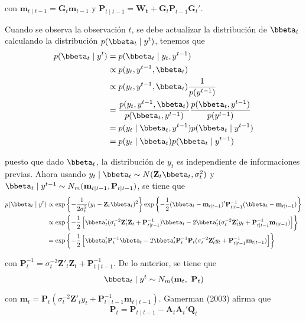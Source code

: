 con $\mathbf{m}_{t\mid t-1}=\mathbf{G}_t\mathbf{m}_{t-1}$ y $\mathbf{P}_{t\mid t-1}=\mathbf{W_t}+\mathbf{G}_t\mathbf{P}_{t-1}\mathbf{G}_t'$.

Cuando se observa la observación $t$, se debe actualizar la distribución de $\bbeta_t$ calculando la distribución $p(\bbeta_t \mid y^t)$, tenemos que
\begin{align*}
p(\bbeta_t \mid y^t)&=p(\bbeta_t \mid y_t,y^{t-1})\\
&\propto p(y_t,y^{t-1},\bbeta_t)\\
&\propto p(y_t,y^{t-1},\bbeta_t)\frac{1}{p(y^{t-1})}\\
&=\frac{p(y_t,y^{t-1},\bbeta_t)}{p(\bbeta_t,y^{t-1})}\frac{p(\bbeta_t,y^{t-1})}{p(y^{t-1})}\\
&=p(y_t \mid \bbeta_t,y^{t-1})p(\bbeta_t \mid y^{t-1})\\
&=p(y_t \mid \bbeta_t)p(\bbeta_t \mid y^{t-1})
\end{align*}

puesto que dado $\bbeta_t$, la distribución de $y_t$ es independiente de informaciones previas. Ahora usando $y_t \mid \bbeta_t\sim N(\mathbf{Z}_t\bbeta_t,\sigma^2_t)$ y $\bbeta_t \mid y^{t-1}\sim N_m(\mathbf{m}_{t\mid t-1},\mathbf{P}_{t\mid t-1})$, se tiene que
\begin{align*}
p(\bbeta_t \mid y^t)&\propto \exp\left\{-\frac{1}{2\sigma_t^2}(y_t-\mathbf{Z}_t\bbeta_t)^2\right\}\exp\left\{-\frac{1}{2}(\bbeta_t-\mathbf{m}_{t\mid t-1})'\mathbf{P}_{t\mid t-1}^{-1}(\bbeta_t-\mathbf{m}_{t\mid t-1})\right\}\\
&\propto\exp\left\{-\frac{1}{2}\left[\bbeta_t'(\sigma^{-2}_t\mathbf{Z}'_t\mathbf{Z}_t+\mathbf{P}_{t\mid t-1}^{-1})\bbeta_t-2\bbeta_t'(\sigma^{-2}_t\mathbf{Z}'_ty_t+\mathbf{P}_{t\mid t-1}^{-1}\mathbf{m}_{t\mid t-1})\right]\right\}\\
&=\exp\left\{-\frac{1}{2}\left[\bbeta_t'\mathbf{P}_t^{-1}\bbeta_t-2\bbeta_t'\mathbf{P}_t^{-1}\mathbf{P}_t(\sigma^{-2}_t\mathbf{Z}'_ty_t+\mathbf{P}_{t\mid t-1}^{-1}\mathbf{m}_{t\mid t-1})\right]\right\}
\end{align*}

con $\mathbf{P}_t^{-1}=\sigma^{-2}_t\mathbf{Z}'_t\mathbf{Z}_t+\mathbf{P}_{t\mid t-1}^{-1}$. De lo anterior, se tiene que 
\begin{equation*}
\bbeta_t\mid y^t \sim N_m(\mathbf{m}_t,\ \mathbf{P}_t)
\end{equation*}

con $\mathbf{m}_t=\mathbf{P}_t(\sigma^{-2}_t\mathbf{Z}'_ty_t+\mathbf{P}_{t\mid t-1}^{-1}\mathbf{m}_{t\mid t-1})$. Gamerman (2003) afirma que 
\begin{equation}\label{demostrarP}
\mathbf{P}_t=\mathbf{P}_{t\mid t-1}-\mathbf{A}_t\mathbf{A}_t'\mathbf{Q}_t
\end{equation}

